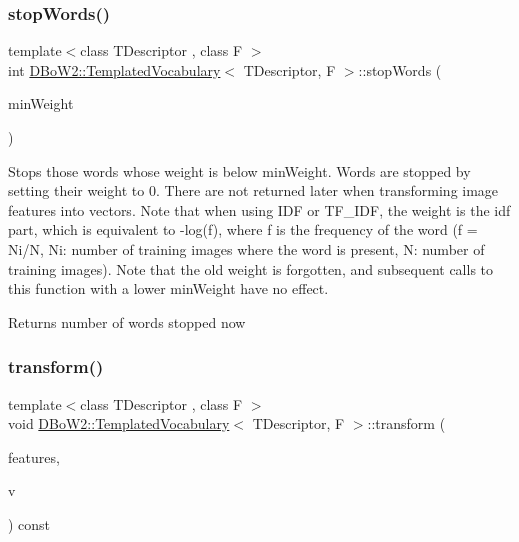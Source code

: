 \subsubsection{\texorpdfstring{stop\+Words()}{stopWords()}}
{\footnotesize\ttfamily template$<$class T\+Descriptor , class F $>$ \\
int \mbox{\hyperlink{class_d_bo_w2_1_1_templated_vocabulary}{D\+Bo\+W2\+::\+Templated\+Vocabulary}}$<$ T\+Descriptor, F $>$\+::stop\+Words (\begin{DoxyParamCaption}\item[{double}]{min\+Weight }\end{DoxyParamCaption})\hspace{0.3cm}{\ttfamily [virtual]}}

Stops those words whose weight is below min\+Weight. Words are stopped by setting their weight to 0. There are not returned later when transforming image features into vectors. Note that when using I\+DF or T\+F\+\_\+\+I\+DF, the weight is the idf part, which is equivalent to -\/log(f), where f is the frequency of the word (f = Ni/N, Ni\+: number of training images where the word is present, N\+: number of training images). Note that the old weight is forgotten, and subsequent calls to this function with a lower min\+Weight have no effect. \begin{DoxyReturn}{Returns}
number of words stopped now 
\end{DoxyReturn}
\mbox{\label{class_d_bo_w2_1_1_templated_vocabulary_a01de3bebec37624439c7d3baf6651ff0}} 
\subsubsection{\texorpdfstring{transform()}{transform()}\hspace{0.1cm}{\footnotesize\ttfamily [1/5]}}
{\footnotesize\ttfamily template$<$class T\+Descriptor , class F $>$ \\
void \mbox{\hyperlink{class_d_bo_w2_1_1_templated_vocabulary}{D\+Bo\+W2\+::\+Templated\+Vocabulary}}$<$ T\+Descriptor, F $>$\+::transform (\begin{DoxyParamCaption}\item[{const std\+::vector$<$ T\+Descriptor $>$ \&}]{features,  }\item[{\mbox{\hyperlink{class_d_bo_w2_1_1_bow_vector}{Bow\+Vector}} \&}]{v }\end{DoxyParamCaption}) const\hspace{0.3cm}{\ttfamily [virtual]}}

